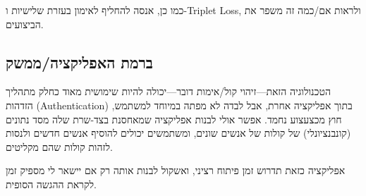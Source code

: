 \documentclass[a4paper]{article}
\begin{document}
כמו כן, אנסה להחליף לאימון בעזרת שלישיות ו-Triplet Loss, ולראות אם/כמה
זה משפר את הביצועים.

\subsection{ברמת האפליקציה/ממשק}
\label{sec:improvements-app}

הטכנולוגיה הזאת---זיהוי קול/אימות דובר---יכולה להיות שימושית מאוד כחלק
מתהליך הזדהות (Authentication) בתוך אפליקציה אחרת, אבל לבדה לא מפתה
במיוחד למשתמש, חוץ מכצעצוע נחמד. אפשר אולי לבנות אפליקציה שמאחסנת
בצד-שרת שלה מסד נתונים (קונבנציונלי) של קולות של אנשים שונים, ומשתמשים
יכולים להוסיף אנשים חדשים ולנסות לזהות קולות שהם מקליטים.

אפליקציה כזאת תדרוש זמן פיתוח רציני, ואשקול לבנות אותה רק אם יישאר לי
מספיק זמן לקראת ההגשה הסופית.
\end{document}
